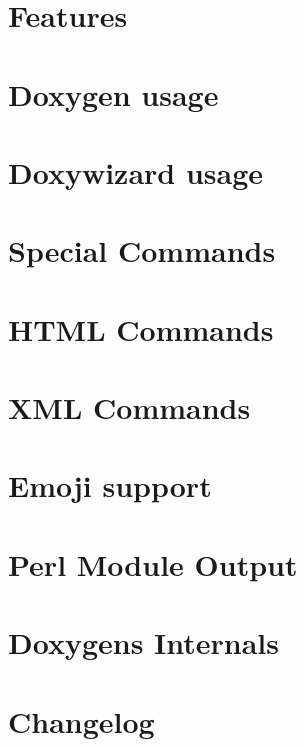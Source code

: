 \let\mypdfximage\pdfximage\def\pdfximage{\immediate\mypdfximage}\documentclass[twoside]{book}
\newcommand{\+}{\discretionary{\mbox{\scriptsize$\hookleftarrow$}}{}{}}
\newcommand{\clearemptydoublepage}{%
  \newpage{\pagestyle{empty}\cleardoublepage}%
}
\begin{document}
\chapter{Features}
\label{features}

\chapter{Doxygen usage}
\label{doxygen_usage}

\chapter{Doxywizard usage}
\label{doxywizard_usage}

\chapter{Special Commands}
\label{commands}

\chapter{H\+T\+ML Commands}
\label{htmlcmds}

\chapter{X\+ML Commands}
\label{xmlcmds}

\chapter{Emoji support}
\label{emojisup}

\chapter{Perl Module Output}
\label{perlmod}

\chapter{Doxygen\textquotesingle{}s Internals}
\label{arch}

\chapter{Changelog}
\label{changelog}


\backmatter
\newpage
{}
\clearemptydoublepage
{}
\printindex
\end{document}
